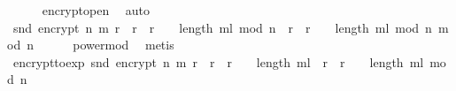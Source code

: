 \begin{isabellebody}
\ \ \ \ \isamarkupfalse%
\ encrypt{\isacharunderscore}{\kern0pt}open\ \isamarkupfalse%
\ auto\isanewline
\ \ \isamarkupfalse%
\ \isamarkupfalse%
\ {\isachardoublequoteopen}snd\ {\isacharparenleft}{\kern0pt}encrypt\ n\ m\ r{\isacharparenright}{\kern0pt}\ {\isacharequal}{\kern0pt}\ {\isacharparenleft}{\kern0pt}{\isacharparenleft}{\kern0pt}r\ {\isacharasterisk}{\kern0pt}\ r{\isacharparenright}{\kern0pt}\ {\isacharcircum}{\kern0pt}\ {\isacharparenleft}{\kern0pt}{}\ {\isacharcircum}{\kern0pt}\ {\isacharparenleft}{\kern0pt}length\ m{\isacharunderscore}{\kern0pt}l{\isacharparenright}{\kern0pt}{\isacharparenright}{\kern0pt}\ mod\ n{\isacharparenright}{\kern0pt}\ {\isacharasterisk}{\kern0pt}\ {\isacharparenleft}{\kern0pt}{\isacharparenleft}{\kern0pt}r\ {\isacharasterisk}{\kern0pt}\ r{\isacharparenright}{\kern0pt}\ {\isacharcircum}{\kern0pt}\ {\isacharparenleft}{\kern0pt}{}\ {\isacharcircum}{\kern0pt}\ {\isacharparenleft}{\kern0pt}length\ m{\isacharunderscore}{\kern0pt}l{\isacharparenright}{\kern0pt}{\isacharparenright}{\kern0pt}\ mod\ n{\isacharparenright}{\kern0pt}\ mod\ n{\isachardoublequoteclose}\isanewline
\ \ \ \ \isamarkupfalse%
\ power{\isacharunderscore}{\kern0pt}mod\ \isamarkupfalse%
\ metis\isanewline
\ \ \isamarkupfalse%
\ \isamarkupfalse%
\ encrypt{\isacharunderscore}{\kern0pt}to{\isacharunderscore}{\kern0pt}exp{\isacharcolon}{\kern0pt}\ {\isachardoublequoteopen}snd\ {\isacharparenleft}{\kern0pt}encrypt\ n\ m\ r{\isacharparenright}{\kern0pt}\ {\isacharequal}{\kern0pt}\ {\isacharparenleft}{\kern0pt}{\isacharparenleft}{\kern0pt}{\isacharparenleft}{\kern0pt}r\ {\isacharasterisk}{\kern0pt}\ r{\isacharparenright}{\kern0pt}\ {\isacharcircum}{\kern0pt}\ {\isacharparenleft}{\kern0pt}{}\ {\isacharcircum}{\kern0pt}\ {\isacharparenleft}{\kern0pt}length\ m{\isacharunderscore}{\kern0pt}l{\isacharparenright}{\kern0pt}{\isacharparenright}{\kern0pt}{\isacharparenright}{\kern0pt}\ {\isacharasterisk}{\kern0pt}\ {\isacharparenleft}{\kern0pt}{\isacharparenleft}{\kern0pt}r\ {\isacharasterisk}{\kern0pt}\ r{\isacharparenright}{\kern0pt}\ {\isacharcircum}{\kern0pt}\ {\isacharparenleft}{\kern0pt}{}\ {\isacharcircum}{\kern0pt}\ {\isacharparenleft}{\kern0pt}length\ m{\isacharunderscore}{\kern0pt}l{\isacharparenright}{\kern0pt}{\isacharparenright}{\kern0pt}{\isacharparenright}{\kern0pt}{\isacharparenright}{\kern0pt}\ mod\ n{\isachardoublequoteclose}\isanewline
\ \ \ \ \isamarkupfalse%

\end{isabellebody}
